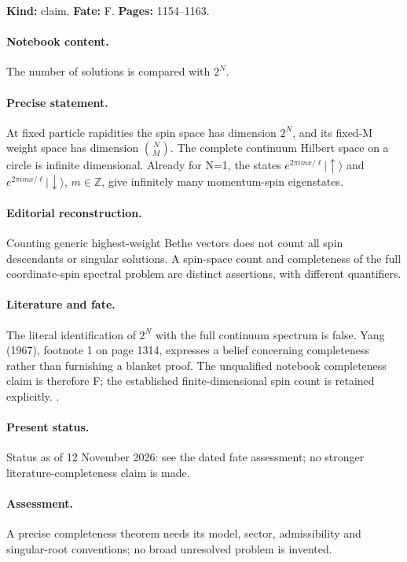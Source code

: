 \noindent\textbf{Kind:} claim. \textbf{Fate:} F. \textbf{Pages:} 1154--1163.\par

\paragraph{Notebook content.} The number of solutions is compared with $2^N$.

\paragraph{Precise statement.} At fixed particle rapidities the spin space has dimension $2^N$, and its fixed-M weight space has dimension $\binom NM$. The complete continuum Hilbert space on a circle is infinite dimensional. Already for N=1, the states $e^{2\pi imx/\ell}|\uparrow\rangle$ and $e^{2\pi imx/\ell}|\downarrow\rangle$, $m\in\mathbb Z$, give infinitely many momentum-spin eigenstates.

\paragraph{Editorial reconstruction.} Counting generic highest-weight Bethe vectors does not count all spin descendants or singular solutions. A spin-space count and completeness of the full coordinate-spin spectral problem are distinct assertions, with different quantifiers.

\paragraph{Literature and fate.} The literal identification of $2^N$ with the full continuum spectrum is false. Yang (1967), footnote 1 on page 1314, expresses a belief concerning completeness rather than furnishing a blanket proof. The unqualified notebook completeness claim is therefore F; the established finite-dimensional spin count is retained explicitly. \citep{yang1967manybody,faddeev1996bethe}.

\paragraph{Present status.} Status as of 12 November 2026: see the dated fate assessment; no stronger literature-completeness claim is made.

\paragraph{Assessment.} A precise completeness theorem needs its model, sector, admissibility and singular-root conventions; no broad unresolved problem is invented.

